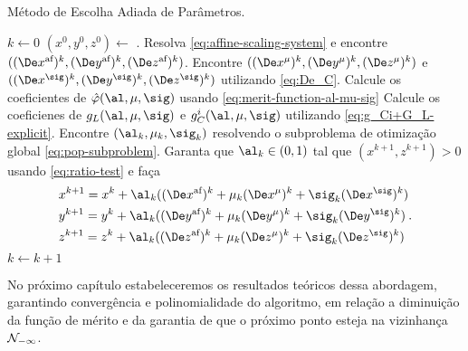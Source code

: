 \begin{algorithm}
\onehalfspacing
\caption{Método de Escolha Adiada de Parâmetros.}
\label{alg:optimized-choice-of-parameters} \begin{algorithmic}[1]
\State $k \gets 0$
\State $(x^0,y^0,z^0) \gets$ .
	\Repeat
		\State Resolva   \eqref{eq:affine-scaling-system} e encontre
		$((\dex)^{k},(\dey)^{k},(\dez)^{k})$.
		\State 	Encontre $((\Dex^\mu)^{k},(\Dey^\mu)^{k},(\Dez^\mu)^{k})$ e
		$((\Dex^\sig)^{k},(\Dey^\sig)^{k},(\Dez^\sig)^{k})$ utilizando
		\eqref{eq:De_C}.
		\State Calcule os coeficientes de  $\nextphi(\al,\mu,\sig)$ usando
		\eqref{eq:merit-function-al-mu-sig} 
		\State Calcule os coeficienes de $g_{L}(\al,\mu,\sig)$ e $g^{i}_{C}(\al,\mu,\sig)$ utilizando \eqref{eq:g_Ci+G_L-explicit}.
		\State Encontre $(\al_{k},\mu_{k},\sig_{k})$ resolvendo o subproblema de
		otimização global 
		\eqref{eq:pop-subproblem}.
		\State Garanta que $\al_k\in(0,1)$ tal que $(x^{k+1},z^{k+1})>0$ usando \eqref{eq:ratio-test} e faça
		\[
		\begin{aligned}	
		& x^{k+1} = x^{k} + \al_k((\dex)^{k} + \mu_{k}(\Dex^\mu)^{k} +
		\sig_{k}(\Dex^\sig)^{k} )
		\\
		& y^{k+1} = y^{k} + \al_k((\dey)^{k} + \mu_{k}(\Dey^\mu)^{k} +
		\sig_{k}(\Dey^\sig)^{k} )
		\\
		& z^{k+1} = z^{k} + \al_k((\dez)^{k} + \mu_{k}(\Dez^\mu)^{k} +
		\sig_{k}(\Dez^\sig)^{k} ) \end{aligned}. 
		\]		
		\State $k\gets k+1$
\EndProcedure
\end{algorithmic}
\end{algorithm}
  
 No próximo capítulo estabeleceremos os resultados teóricos dessa abordagem, garantindo convergência e polinomialidade do algoritmo, em relação a diminuição da função de mérito e da garantia de que o próximo ponto esteja na vizinhança $\mathcal{N}_{-\infty}$.
 
